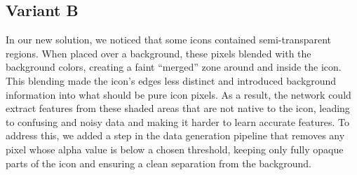 \subsection{Variant B}
In our new solution, we noticed that some icons contained semi-transparent
regions. When placed over a background, these pixels blended with the
background colors, creating a faint “merged” zone around and inside the icon.
This blending made the icon's edges less distinct and introduced background
information into what should be pure icon pixels. As a result, the network
could extract features from these shaded areas that are not native to the icon,
leading to confusing and noisy data and making it harder to learn accurate
features. To address this, we added a step in the data generation pipeline that
removes any pixel whose alpha value is below a chosen threshold, keeping only
fully opaque parts of the icon and ensuring a clean separation from the
background.
